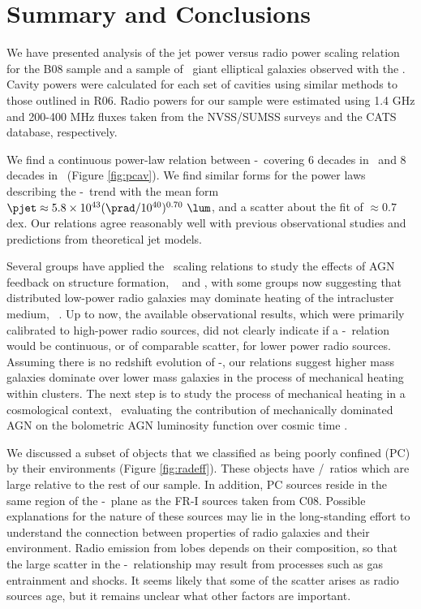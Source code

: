\documentclass{emulateapj}
\begin{document}
\section{Summary and Conclusions}
\label{sec:summary}

We have presented analysis of the jet power versus radio power scaling
relation for the B08 sample and a sample of \samp\ giant elliptical
galaxies observed with the \cxo. Cavity powers were calculated for
each set of cavities using similar methods to those outlined in
R06. Radio powers for our sample were estimated using 1.4 GHz and
200-400 MHz fluxes taken from the NVSS/SUMSS surveys and the CATS
database, respectively.

We find a continuous power-law relation between \pjet-\prad\ covering
6 decades in \prad\ and 8 decades in \pjet\ (Figure
\ref{fig:pcav}). We find similar forms for the power laws describing
the \pjet-\prad\ trend with the mean form $\pjet \approx 5.8 \times
10^{43} (\prad/10^{40})^{0.70} ~\lum$, and a scatter about the fit of
$\approx 0.7$ dex. Our relations agree reasonably well with previous
observational studies and predictions from theoretical jet models.

Several groups have applied the \birzan\ scaling relations to study
the effects of AGN feedback on structure formation,
\eg\ \citet{best07} and \citet{2007MNRAS.379..260M}, with some groups
now suggesting that distributed low-power radio galaxies may dominate
heating of the intracluster medium,
\eg\ \citet{2009ApJ...705..854H}. Up to now, the available
observational results, which were primarily calibrated to high-power
radio sources, did not clearly indicate if a \pjet-\prad\ relation
would be continuous, or of comparable scatter, for lower power radio
sources. Assuming there is no redshift evolution of \pjet-\prad, our
relations suggest higher mass galaxies dominate over lower mass
galaxies in the process of mechanical heating within clusters. The
next step is to study the process of mechanical heating in a
cosmological context, \eg\ evaluating the contribution of mechanically
dominated AGN on the bolometric AGN luminosity function over cosmic
time \citep[\ie][]{2009MNRAS.395..518C}.

We discussed a subset of objects that we classified as being poorly
confined (PC) by their environments (Figure \ref{fig:radeff}). These
objects have \pjet/\prad\ ratios which are large relative to the rest
of our sample. In addition, PC sources reside in the same region of
the \pjet-\prad\ plane as the FR-I sources taken from C08. Possible
explanations for the nature of these sources may lie in the
long-standing effort to understand the connection between properties
of radio galaxies and their environment. Radio emission from lobes
depends on their composition, so that the large scatter in the
\pjet-\prad\ relationship may result from processes such as gas
entrainment and shocks. It seems likely that some of the scatter
arises as radio sources age, but it remains unclear what other factors
are important.
\end{document}
